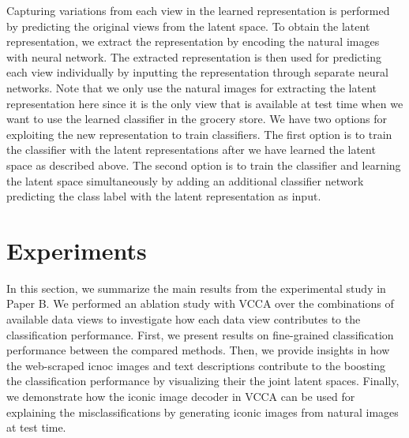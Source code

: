 Capturing variations from each view in the learned representation is performed by predicting the original views from the latent space. To obtain the latent representation, we extract the representation by encoding the natural images with neural network. The extracted representation is then used for predicting each view individually by inputting the representation through separate neural networks. Note that we only use the natural images for extracting the latent representation here since it is the only view that is available at test time when we want to use the learned classifier in the grocery store. We have two options for exploiting the new representation to train classifiers. The first option is to train the classifier with the latent representations after we have learned the latent space as described above. The second option is to train the classifier and learning the latent space simultaneously by adding an additional classifier network predicting the class label with the latent representation as input. 







\section{Experiments}

In this section, we summarize the main results from the experimental study in Paper B. We performed an ablation study with VCCA over the combinations of available data views to investigate how each data view contributes to the classification performance. First, we present results on fine-grained classification performance between the compared methods. Then, we provide insights in how the web-scraped icnoc images and text descriptions contribute to the boosting the classification performance by visualizing their the joint latent spaces. Finally, we demonstrate how the iconic image decoder in VCCA can be used for explaining the misclassifications by generating iconic images from natural images at test time. 

